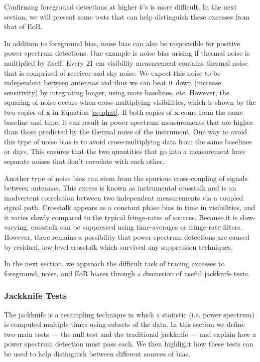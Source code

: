 \documentclass[preprint2,numberedappendix,tighten]{aastex6}  %
\begin{document}
Confirming foreground detections at higher $k$'s is more difficult. In the next section, we will present some tests that can help distinguish these excesses from that of EoR. 

In addition to foreground bias, noise bias can also be responsible for positive power spectrum detections. One example is noise bias arising if thermal noise is multiplied by itself. Every $21$ cm visibility measurement contains thermal noise that is comprised of receiver and sky noise. We expect this noise to be independent between antennas and thus we can beat it down (increase sensitivity) by integrating longer, using more baselines, etc. However, the squaring of noise occurs when cross-multiplying visibilities, which is shown by the two copies of $\textbf{x}$ in Equation \ref{eq:qhat}. If both copies of $\textbf{x}$ come from the same baseline and time, it can result in power spectrum measurements that are higher than those predicted by the thermal noise of the instrument. One way to avoid this type of noise bias is to avoid cross-multiplying data from the same baselines or days. This ensures that the two quantities that go into a measurement have separate noises that don't correlate with each other. 

Another type of noise bias can stem from the spurious cross-coupling of signals between antennas. This excess is known as instrumental crosstalk and is an inadvertent correlation between two independent measurements via a coupled signal path. Crosstalk appears as a constant phase bias in time in visibilities, and it varies slowly compared to the typical fringe-rates of sources. Because it is slow-varying, crosstalk can be suppressed using time-averages or fringe-rate filters. However, there remains a possibility that power spectrum detections are caused by residual, low-level crosstalk which survived any suppression techniques. 

In the next section, we approach the difficult task of tracing excesses to foreground, noise, and EoR biases through a discussion of useful jackknife tests.

\subsubsection{Jackknife Tests}

The jackknife is a resampling technique in which a statistic (i.e. power spectrum) is computed multiple times using subsets of the data. In this section we define two main tests --- the null test and the traditional jackknife --- and explain how a power spectrum detection must pass each. We then highlight how these tests can be used to help distinguish between different sources of bias.
 
\end{document}
